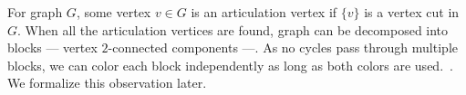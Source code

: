 For graph \( G \), some vertex \( v \in G \) is an articulation vertex if
\( \{v\} \) is a vertex cut in \( G \).
When all the articulation vertices are found,
graph can be decomposed into blocks
--- vertex \( 2 \)-connected components ---.
As no cycles pass through multiple blocks, we can color each block
independently as long as both colors are used.~\cite{my_paper}.
We formalize this observation later.

